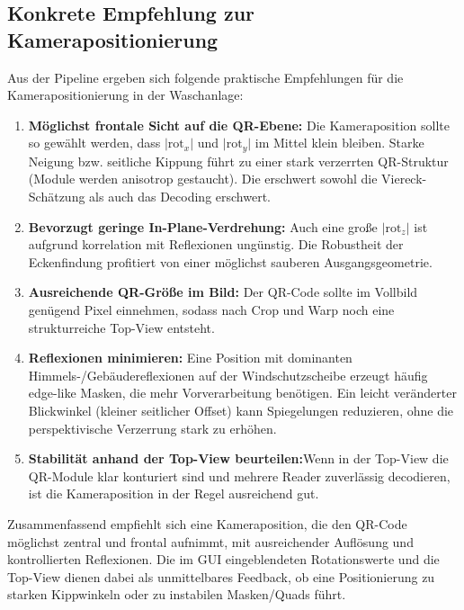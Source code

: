\subsection{Konkrete Empfehlung zur Kamerapositionierung}
\label{subsec:camera_reco_recommendation}

Aus der Pipeline ergeben sich folgende praktische Empfehlungen für die Kamerapositionierung in der Waschanlage:

\begin{enumerate}
    \item \textbf{Möglichst frontale Sicht auf die \ac{QR}-Ebene:} Die Kameraposition sollte so gewählt werden, dass $\lvert \mathrm{rot}_x \rvert$ und $\lvert \mathrm{rot}_y \rvert$ im Mittel klein bleiben. Starke Neigung bzw. seitliche Kippung führt zu einer stark verzerrten \ac{QR}-Struktur (Module werden anisotrop gestaucht). Die erschwert sowohl die Viereck-Schätzung als auch das Decoding erschwert.
    \item \textbf{Bevorzugt geringe In-Plane-Verdrehung:} Auch eine große $\lvert \mathrm{rot}_z \rvert$ ist aufgrund korrelation mit Reflexionen ungünstig. Die Robustheit der Eckenfindung profitiert von einer möglichst \glqq sauberen\grqq{} Ausgangsgeometrie.
    \item \textbf{Ausreichende \ac{QR}-Größe im Bild:} Der \ac{QR}-Code sollte im Vollbild genügend Pixel einnehmen, sodass nach Crop und Warp noch eine strukturreiche Top-View entsteht. 
    \item \textbf{Reflexionen minimieren:} Eine Position mit dominanten \mbox{Himmels-/Gebäudereflexionen} auf der Windschutzscheibe erzeugt häufig \glqq edge-like\grqq{} Masken, die mehr Vorverarbeitung benötigen. Ein leicht veränderter Blickwinkel (kleiner seitlicher Offset) kann Spiegelungen reduzieren, ohne die perspektivische Verzerrung stark zu erhöhen.
    \item \textbf{Stabilität anhand der Top-View beurteilen:}Wenn in der Top-View die \ac{QR}-Module klar konturiert sind und mehrere Reader zuverlässig decodieren, ist die Kameraposition in der Regel ausreichend gut.
\end{enumerate}

Zusammenfassend empfiehlt sich eine Kameraposition, die den \ac{QR}-Code möglichst zentral und frontal aufnimmt, mit ausreichender Auflösung und kontrollierten Reflexionen. Die im \ac{GUI} eingeblendeten Rotationswerte und die Top-View dienen dabei als unmittelbares Feedback, ob eine Positionierung zu starken Kippwinkeln oder zu instabilen Masken/Quads führt.

